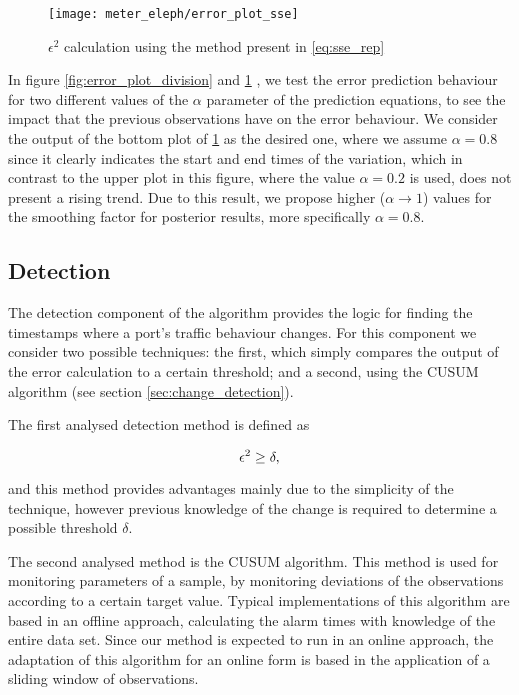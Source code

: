 \begin{figure}[H]
    \label{fig:error_sse}
    \texttt{[image: meter\_eleph/error\_plot\_sse]}
    \caption{$\epsilon^2$ calculation using the method present in \ref{eq:sse_rep}}
    \label{fig:error_plot_sse}
\end{figure}

\par In figure \ref{fig:error_plot_division} and \ref{fig:error_plot_sse} , we test the error prediction behaviour for two different values of the $\alpha$ parameter
of the prediction equations, to see the impact that the previous observations have on the error behaviour. We consider the output of the bottom plot of 
\ref{fig:error_plot_sse} as the desired one, where we assume $\alpha = 0.8$ since it clearly indicates the start and end times of the variation, which in contrast 
to the upper plot in this figure, where the value $\alpha = 0.2$ is used, does not present a rising trend. Due to this result, we propose higher ($\alpha \rightarrow 
1$) values for the smoothing factor for posterior results, more specifically $\alpha = 0.8$.

\subsection{Detection}

The detection component of the algorithm provides the logic for finding the timestamps where a port's traffic behaviour changes. For this component we consider two
possible techniques: the first, which simply compares the output of the error calculation to a certain threshold; and a second, using the CUSUM algorithm (see 
section \ref{sec:change_detection}).

\par The first analysed detection method is defined as

\begin{equation*}
    \centering
    \label{eq:detection_method}
    \epsilon^2 \geq \delta,
\end{equation*}

\par and this method provides advantages mainly due to the simplicity of the technique, however previous knowledge of the change is required to determine a
possible threshold $\delta$.

\par The second analysed method is the CUSUM algorithm. This method is used for monitoring parameters of a sample, by monitoring deviations of the observations
according to a certain target value. Typical implementations of this algorithm are based in an offline approach, calculating the alarm times with knowledge of the 
entire data set. Since our method is expected to run in an online approach, the adaptation of this algorithm for an online form is based in the application of a 
sliding window of observations.

